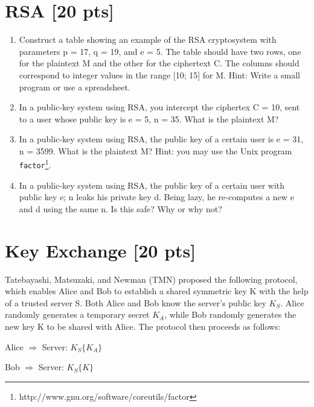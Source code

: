 \documentclass[11pt]{article}
\begin{document}
\medskip






\vspace{1in}


\section{RSA [20 pts] }
\begin{enumerate}
\item  Construct a table showing an example of the RSA cryptosystem with parameters p = 17, q = 19, and e = 5. The table should have two rows, one for the plaintext M and the other for the ciphertext C. The columns should correspond to integer values in the range [10; 15] for M. Hint: Write a small program or use a spreadsheet.
\item In a public-key system using RSA, you intercept the ciphertex C = 10, sent to a user whose public key is e = 5, n = 35. What is the plaintext M?
\item In a public-key system using RSA, the public key of a certain user is e = 31, n = 3599. What is the plaintext M? Hint: you may use the Unix program \texttt{factor}\footnote{http://www.gnu.org/software/coreutils/factor}.
\item In a public-key system using RSA, the public key of a certain user with public key e; n leaks his private key d. Being lazy, he re-computes a new e and d using the same n. Is this safe? Why or why not?
\end{enumerate}

\newpage





\section{Key Exchange [20 pts] }

Tatebayashi, Matsuzaki, and Newman (TMN) proposed the following protocol, which enables Alice and Bob to establish a shared symmetric key K with the help of a trusted server S. Both Alice and Bob know the server's public key $K_S$. Alice randomly generates a temporary secret $K_A$, while Bob randomly generates the new key K to be shared with Alice. The protocol then proceeds as follows:

	Alice $\Rightarrow$ Server:  $K_S\{K_A\}$

	Bob $\Rightarrow $ Server: $K_S\{K\}$
\end{document}
